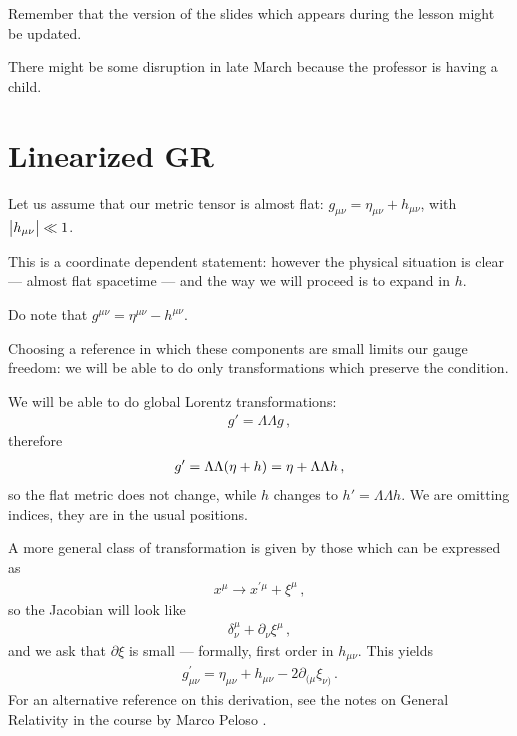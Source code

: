 \documentclass[main.tex]{subfiles}
\begin{document}

Remember that the version of the slides which appears during the lesson might be updated. 

There might be some disruption in late March because the professor is having a child. 

\section{Linearized GR}

Let us assume that our metric tensor is almost flat: \(g_{\mu \nu } = \eta_{\mu \nu } + h_{\mu \nu }\), with \(\abs{h_{\mu \nu }} \ll 1\).

This is a coordinate dependent statement: however the physical situation is clear --- almost flat spacetime --- and the way we will proceed is to expand in \(h\).

Do note that \(g^{\mu \nu } = \eta^{\mu \nu } - h^{\mu \nu }\). 

Choosing a reference in which these components are small limits our gauge freedom: we will be able to do only transformations which preserve the condition. 

We will be able to do global Lorentz transformations: 
%
\begin{align}
g' = \Lambda \Lambda g
\,,
\end{align}
%
therefore 
%
\begin{align}
g' = \Lambda \Lambda \qty(\eta + h) = \eta + \Lambda \Lambda h
\,,
\end{align}
%
so the flat metric does not change, while \(h\) changes to  \(h' = \Lambda \Lambda h\). We are omitting indices, they are in the usual positions. 

A more general class of transformation is given by those which can be expressed as 
%
\begin{align}
x^{\mu } \rightarrow x^{\prime \mu } + \xi^{\mu }
\,,
\end{align}
%
so the Jacobian will look like 
%
\begin{align}
\delta^{ \mu }_{\nu } + \partial_{\nu } \xi^{ \mu }
\,,
\end{align}
%
and we ask that \(\partial \xi \) is small --- formally, first order in \(h_{\mu \nu }\). This yields 
%
\begin{align}
g^{\prime }_{\mu \nu } = \eta_{\mu \nu } + h_{\mu \nu } - 2 \partial_{(\mu  }\xi_{\nu )}
\,.
\end{align}
%
For an alternative reference on this derivation, see the notes on General Relativity in the course by Marco Peloso \cite[section 10]{tissinoGeneralRelativityNotes2020}.
\end{document}
